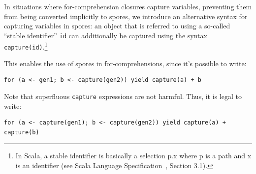 \documentclass[runningheads]{llncs}
\begin{document}
\begin{sloppypar}









In situations where for-comprehension closures capture variables, preventing
them from being converted implicitly to spores, we introduce an alternative
syntax for capturing variables in spores: an object that is referred to using a
so-called ``stable identifier'' \verb|id| can additionally be captured using
the syntax \verb|capture(id)|.\footnote{In Scala, a stable identifier is
basically a selection p.x where p is a path and x is an identifier (see Scala
Language Specification~\cite{ScalaSpec}, Section 3.1).}

This enables the use of spores in for-comprehensions, since it's possible to write:

\begin{lstlisting}[numbers=none]
    for (a <- gen1; b <- capture(gen2)) yield capture(a) + b
\end{lstlisting}

\noindent Note that superfluous \verb|capture| expressions are not harmful. Thus, it is
legal to write:

\begin{lstlisting}[numbers=none]
    for (a <- capture(gen1); b <- capture(gen2)) yield capture(a) + capture(b)
\end{lstlisting}


\end{sloppypar}
\end{document}
